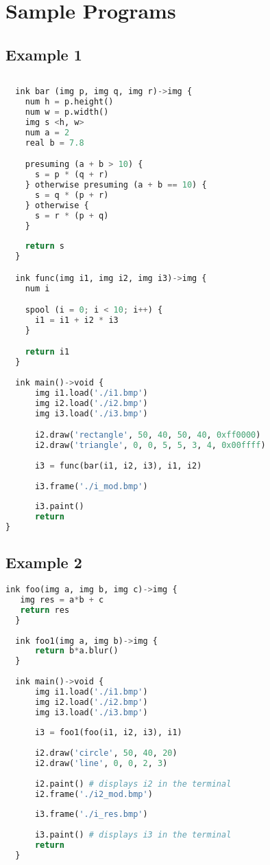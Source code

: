 \documentclass[a4paper, 11pt]{article}
\begin{document}
\section{Sample Programs}

\subsection*{Example 1}

\begin{lstlisting}[language=Python]
  
  ink bar (img p, img q, img r)->img {
    num h = p.height()
    num w = p.width()
    img s <h, w>
    num a = 2
    real b = 7.8

    presuming (a + b > 10) {
      s = p * (q + r)
    } otherwise presuming (a + b == 10) {
      s = q * (p + r)
    } otherwise {
      s = r * (p + q)
    }
      
    return s
  }

  ink func(img i1, img i2, img i3)->img {
    num i

    spool (i = 0; i < 10; i++) {
      i1 = i1 + i2 * i3
    }

    return i1
  }
  
  ink main()->void {
      img i1.load('./i1.bmp')
      img i2.load('./i2.bmp')
      img i3.load('./i3.bmp')

      i2.draw('rectangle', 50, 40, 50, 40, 0xff0000)
      i2.draw('triangle', 0, 0, 5, 5, 3, 4, 0x00ffff)
  
      i3 = func(bar(i1, i2, i3), i1, i2)
  
      i3.frame('./i_mod.bmp')
  
      i3.paint()
      return
}
\end{lstlisting}


\subsection*{Example 2}


\begin{lstlisting}[language=Python]
  ink foo(img a, img b, img c)->img { 
   img res = a*b + c 
   return res
  }
  
  ink foo1(img a, img b)->img {
      return b*a.blur()
  }
  
  ink main()->void {
      img i1.load('./i1.bmp')
      img i2.load('./i2.bmp')
      img i3.load('./i3.bmp')
  
      i3 = foo1(foo(i1, i2, i3), i1)
  
      i2.draw('circle', 50, 40, 20)
      i2.draw('line', 0, 0, 2, 3)
  
      i2.paint() # displays i2 in the terminal
      i2.frame('./i2_mod.bmp')
  
      i3.frame('./i_res.bmp')
  
      i3.paint() # displays i3 in the terminal
      return
  }
\end{lstlisting}

\end{document}
